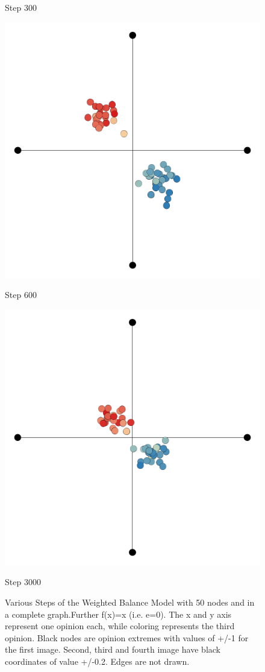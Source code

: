 \documentclass[11pt]{article}
\begin{document}
\begin{figure}[htp!]
  \caption*{Step 300}
\endminipage\hfill
{}
  \includegraphics[width=\linewidth]{images/Evolutions/WB_0600_02.png}
  \caption*{Step 600}
\endminipage\hfill
{}
  \includegraphics[width=\linewidth]{images/Evolutions/WB_3000_02.png}
  \caption*{Step 3000}
\endminipage\hfill
\vspace{0.5cm}
\caption{Various Steps of the Weighted Balance Model with 50 nodes and in a complete graph.Further f(x)=x (i.e. e=0). The x and y axis represent one opinion each, while coloring represents the third opinion. Black nodes are opinion extremes with values of +/-1 for the first image. Second, third and fourth image have black coordinates of value +/-0.2. Edges are not drawn.}
\label{WBT_Evo}
\end{figure}
\end{document}
